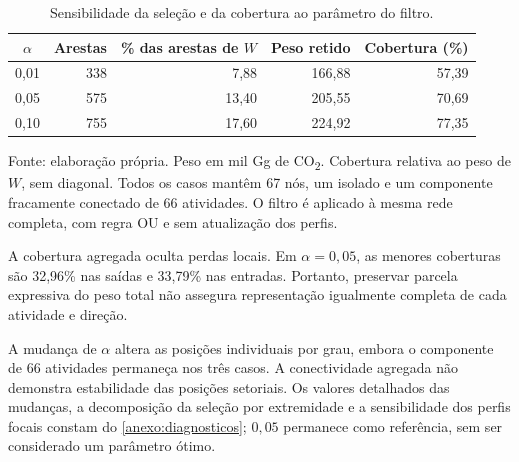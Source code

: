 \begin{table}[htbp]
\centering
\caption{Sensibilidade da seleção e da cobertura ao parâmetro do filtro.}
\label{tab:sensibilidade-backbone}
\small
\begin{tabular}{@{}crrrr@{}}
\toprule
$\alpha$ & Arestas & \% das arestas de $W$ & Peso retido & Cobertura (\%) \\
\midrule
0,01 & 338 & 7,88 & 166,88 & 57,39 \\
0,05 & 575 & 13,40 & 205,55 & 70,69 \\
0,10 & 755 & 17,60 & 224,92 & 77,35 \\
\bottomrule
\end{tabular}
\par\smallskip\begin{minipage}{\textwidth}\footnotesize
Fonte: elaboração própria. Peso em mil Gg de CO\textsubscript{2}. Cobertura relativa ao peso de $W$, sem diagonal. Todos os casos mantêm 67 nós, um isolado e um componente fracamente conectado de 66 atividades. O filtro é aplicado à mesma rede completa, com regra OU e sem atualização dos perfis.
\end{minipage}
\end{table}

A cobertura agregada oculta perdas locais. Em $\alpha=0{,}05$, as menores coberturas são 32,96\% nas saídas e 33,79\% nas entradas. Portanto, preservar parcela expressiva do peso total não assegura representação igualmente completa de cada atividade e direção.

A mudança de $\alpha$ altera as posições individuais por grau, embora o componente de 66 atividades permaneça nos três casos. A conectividade agregada não demonstra estabilidade das posições setoriais. Os valores detalhados das mudanças, a decomposição da seleção por extremidade e a sensibilidade dos perfis focais constam do \ref{anexo:diagnosticos}; $0{,}05$ permanece como referência, sem ser considerado um parâmetro ótimo.





